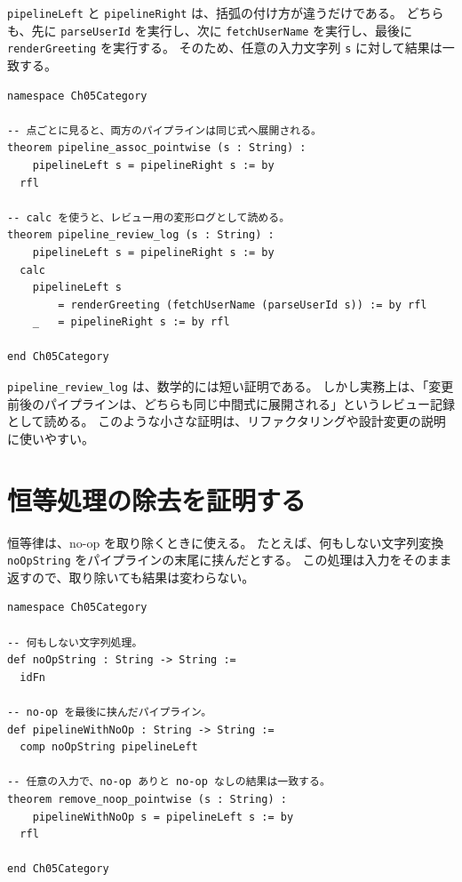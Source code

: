 \texttt{pipelineLeft} と \texttt{pipelineRight} は、括弧の付け方が違うだけである。
どちらも、先に \texttt{parseUserId} を実行し、次に \texttt{fetchUserName} を実行し、最後に \texttt{renderGreeting} を実行する。
そのため、任意の入力文字列 \texttt{s} に対して結果は一致する。

\begin{listing}[htbp]
\begin{verbatim}
namespace Ch05Category

-- 点ごとに見ると、両方のパイプラインは同じ式へ展開される。
theorem pipeline_assoc_pointwise (s : String) :
    pipelineLeft s = pipelineRight s := by
  rfl

-- calc を使うと、レビュー用の変形ログとして読める。
theorem pipeline_review_log (s : String) :
    pipelineLeft s = pipelineRight s := by
  calc
    pipelineLeft s
        = renderGreeting (fetchUserName (parseUserId s)) := by rfl
    _   = pipelineRight s := by rfl

end Ch05Category
\end{verbatim}
\caption{パイプラインの結合律をレビュー可能な形で確認する}
\label{lst:ch05_pipeline_proof}
\end{listing}

\texttt{pipeline\_review\_log} は、数学的には短い証明である。
しかし実務上は、「変更前後のパイプラインは、どちらも同じ中間式に展開される」というレビュー記録として読める。
このような小さな証明は、リファクタリングや設計変更の説明に使いやすい。

\section{恒等処理の除去を証明する}

恒等律は、no-op を取り除くときに使える。
たとえば、何もしない文字列変換 \texttt{noOpString} をパイプラインの末尾に挟んだとする。
この処理は入力をそのまま返すので、取り除いても結果は変わらない。

\begin{listing}[htbp]
\begin{verbatim}
namespace Ch05Category

-- 何もしない文字列処理。
def noOpString : String -> String :=
  idFn

-- no-op を最後に挟んだパイプライン。
def pipelineWithNoOp : String -> String :=
  comp noOpString pipelineLeft

-- 任意の入力で、no-op ありと no-op なしの結果は一致する。
theorem remove_noop_pointwise (s : String) :
    pipelineWithNoOp s = pipelineLeft s := by
  rfl

end Ch05Category
\end{verbatim}
\caption{何もしない処理を取り除いても結果が変わらない}
\label{lst:ch05_noop}
\end{listing}

